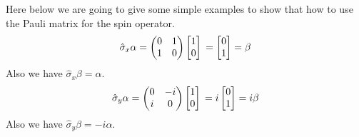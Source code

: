 Here below we are going to give some simple examples to show that
how to use the Pauli matrix for the spin operator.
\begin{equation}\label{SPINeq:10}
\hat{\sigma}_{x}\alpha = \begin{pmatrix}
                     0 & 1 \\
                     1 & 0 \\
                   \end{pmatrix}
                   \begin{bmatrix}
                     1 \\
                     0 \\
                   \end{bmatrix} \nonumber \\
                      =
                   \begin{bmatrix}
                     0 \\
                     1 \\
                   \end{bmatrix}
                   =\beta
\end{equation}
Also we have $\hat{\sigma}_{x}\beta=\alpha$.
\begin{equation}\label{SPINeq:11}
\hat{\sigma}_{y}\alpha = \begin{pmatrix}
                     0 & -i \\
                     i & 0 \\
                   \end{pmatrix}
                   \begin{bmatrix}
                     1 \\
                     0 \\
                   \end{bmatrix} \nonumber \\
                      =i
                      \begin{bmatrix}
                      0 \\
                      1 \\
                   \end{bmatrix}
                   =i\beta
\end{equation}
Also we have $\hat{\sigma}_{y}\beta=-i\alpha$.

